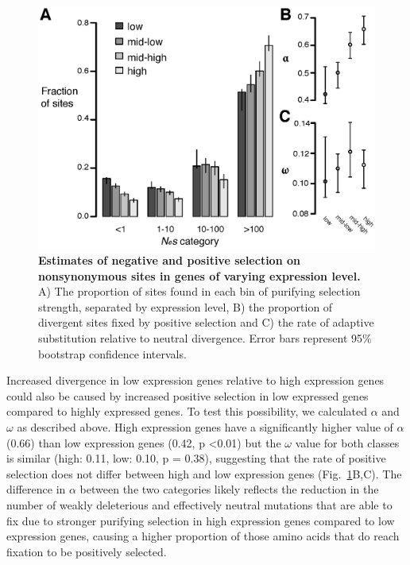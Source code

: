 \begin{figure}[ht!]
      \centering
       \includegraphics[scale=0.8]{Ch2Fig4}
    \caption{\textbf{Estimates of negative and positive selection on nonsynonymous sites in genes of varying expression level.} A) The proportion of sites found in each bin of purifying selection strength, separated by expression level,  B) the proportion of divergent sites fixed by positive selection and C) the rate of adaptive substitution relative to neutral divergence. Error bars represent 95\% bootstrap confidence intervals. }
    \label{fig:fig4}
\end{figure}

Increased divergence in low expression genes relative to high expression genes could also be caused by increased positive selection in low expressed genes compared to highly expressed genes. To test this possibility, we calculated $\alpha$ and $\omega$ as described above. High expression genes have a significantly higher value of $\alpha$ (0.66) than low expression genes (0.42, p \textless 0.01) but the $\omega$ value for both classes is similar (high: 0.11, low: 0.10, p = 0.38), suggesting that the rate of positive selection does not differ between high and low expression genes (Fig.~\ref{fig:fig4}B,C). The difference in $\alpha$ between the two categories likely reflects the reduction in the number of weakly deleterious and effectively neutral mutations that are able to fix due to stronger purifying selection in high expression genes compared to low expression genes, causing a higher proportion of those amino acids that do reach fixation to be positively selected. 


